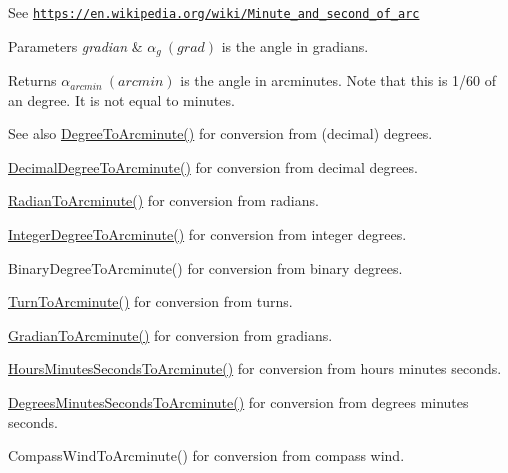 See \href{https://en.wikipedia.org/wiki/Minute_and_second_of_arc}{\tt https\+://en.\+wikipedia.\+org/wiki/\+Minute\+\_\+and\+\_\+second\+\_\+of\+\_\+arc} 
\begin{DoxyParams}{Parameters}
{\em gradian} & $\alpha_{g}\ (grad)$ is the angle in gradians. \\
\hline
\end{DoxyParams}
\begin{DoxyReturn}{Returns}
$\alpha_{arcmin}\ (arcmin)$ is the angle in arcminutes. Note that this is 1/60 of an degree. It is not equal to minutes. 
\end{DoxyReturn}
\begin{DoxySeeAlso}{See also}
\mbox{\hyperlink{group___e_g_x_math-_angle_conversions-_degree_ga8abf327dc5f52907b2c881999e9cc43e}{Degree\+To\+Arcminute()}} for conversion from (decimal) degrees. 

\mbox{\hyperlink{group___e_g_x_math-_angle_conversions-_decimal_degree_ga6b6ea6e45d2a13f556824ca419cc9fbd}{Decimal\+Degree\+To\+Arcminute()}} for conversion from decimal degrees. 

\mbox{\hyperlink{group___e_g_x_math-_angle_conversions-_radian_ga722e3b8e78540a6b3942b73b64aeb8d2}{Radian\+To\+Arcminute()}} for conversion from radians. 

\mbox{\hyperlink{group___e_g_x_math-_angle_conversions-_integer_degree_ga78b014e7649d666a3647c467e64e4fe8}{Integer\+Degree\+To\+Arcminute()}} for conversion from integer degrees. 

Binary\+Degree\+To\+Arcminute() for conversion from binary degrees. 

\mbox{\hyperlink{group___e_g_x_math-_angle_conversions-_turn_ga72cda928d9043c7d82097b1a7920769e}{Turn\+To\+Arcminute()}} for conversion from turns. 

\mbox{\hyperlink{group___e_g_x_math-_angle_conversions-_gradian_ga67ef7daad49b0d73c39c52d426ab46a5}{Gradian\+To\+Arcminute()}} for conversion from gradians. 

\mbox{\hyperlink{group___e_g_x_math-_angle_conversions-_hours_minutes_seconds_ga23bfa5abeb014726c2e2ac6303be5dae}{Hours\+Minutes\+Seconds\+To\+Arcminute()}} for conversion from hours minutes seconds. 

\mbox{\hyperlink{group___e_g_x_math-_angle_conversions-_degrees_minutes_seconds_gadb8da2c4b9cdd4f618b6281314b1318c}{Degrees\+Minutes\+Seconds\+To\+Arcminute()}} for conversion from degrees minutes seconds. 

Compass\+Wind\+To\+Arcminute() for conversion from compass wind. 
\end{DoxySeeAlso}
\mbox{\label{group___e_g_x_math-_angle_conversions-_gradian_gac768fd444195264165d332f2f5e84d92}} 
